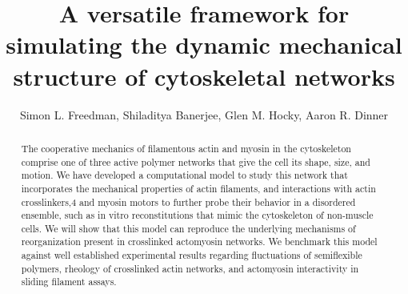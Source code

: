 \documentclass[12pt]{article}
\begin{document}
\title{A versatile framework for simulating the dynamic mechanical structure of cytoskeletal networks}
\author{Simon L. Freedman, Shiladitya Banerjee, Glen M. Hocky, Aaron R. Dinner}
\date{}
\maketitle
\begin{abstract} 
  The cooperative mechanics of filamentous actin and myosin in the cytoskeleton comprise one of three active polymer
  networks that give the cell its shape, size, and motion. We have developed a computational model to study this network that incorporates 
  the mechanical properties of actin filaments, and interactions with actin crosslinkers,4 and myosin motors to further
  probe their behavior in a disordered ensemble, such as in vitro reconstitutions that mimic the cytoskeleton of non-muscle cells. 
  We will show that this model can reproduce the underlying mechanisms of reorganization
  present in crosslinked actomyosin networks. We benchmark this model against well established experimental results regarding fluctuations of
  semiflexible polymers, rheology of crosslinked actin networks, and actomyosin interactivity in sliding filament assays. 
\end{abstract}
\end{document}
